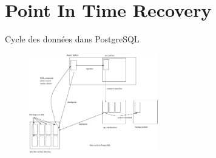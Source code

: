 
\section{Point In Time Recovery}


\begin{frame}{Cycle des données dans PostgreSQL}

\begin{figure}
\begin{center}
\includegraphics[angle=0, width=0.5\textwidth]{images/internals.eps}
\end{center}
\end{figure}

\begin{toile}
\end{toile}

\end{frame}


